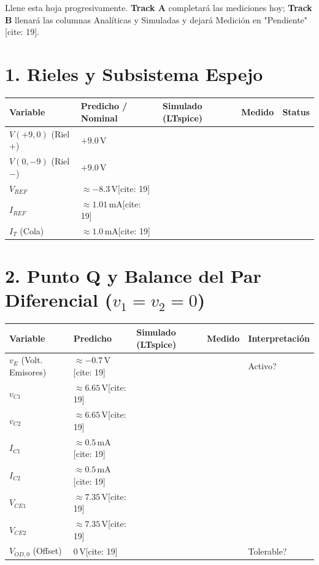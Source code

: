 \documentclass[11pt, a4paper]{article}
\begin{document}
\begin{tcolorbox}[colback=ucbblue!5, colframe=ucbblue, title=\textbf{Registro de Evidencia: Hito 2 (Sesión 1)}]
    Llene esta hoja progresivamente. \textbf{Track A} completará las mediciones hoy; \textbf{Track B} llenará las columnas Analíticas y Simuladas y dejará Medición en "Pendiente"[cite: 19].
\end{tcolorbox}

\section*{1. Rieles y Subsistema Espejo}
\renewcommand{\arraystretch}{1.5}
\begin{tabularx}{\textwidth}{|>{\raggedright\arraybackslash}p{3cm}|>{\centering\arraybackslash}X|>{\centering\arraybackslash}X|>{\centering\arraybackslash}X|>{\centering\arraybackslash}p{2.5cm}|}
\hline
\rowcolor{ucbblue!20}
\textbf{Variable} & \textbf{Predicho / Nominal} & \textbf{Simulado (LTspice)} & \textbf{Medido} & \textbf{Status} \\ \hline
$V(+9,0)$ (Riel $+$) & $+9.0\,\text{V}$ & & & \\ \hline
$V(0,-9)$ (Riel $-$) & $+9.0\,\text{V}$ & & & \\ \hline
$V_{REF}$ & $\approx -8.3\,\text{V}$[cite: 19] & & & \\ \hline
$I_{REF}$ & $\approx 1.01\,\text{mA}$[cite: 19] & & & \\ \hline
$I_T$ (Cola) & $\approx 1.0\,\text{mA}$[cite: 19] & & & \\ \hline
\end{tabularx}

\section*{2. Punto Q y Balance del Par Diferencial ($v_1=v_2=0$)}
\begin{tabularx}{\textwidth}{|>{\raggedright\arraybackslash}p{3cm}|>{\centering\arraybackslash}X|>{\centering\arraybackslash}X|>{\centering\arraybackslash}X|>{\centering\arraybackslash}p{2.5cm}|}
\hline
\rowcolor{ucbblue!20}
\textbf{Variable} & \textbf{Predicho} & \textbf{Simulado (LTspice)} & \textbf{Medido} & \textbf{Interpretación} \\ \hline
$v_E$ (Volt. Emisores) & $\approx -0.7\,\text{V}$[cite: 19] & & & Activo? \\ \hline
$v_{C1}$ & $\approx 6.65\,\text{V}$[cite: 19] & & & \\ \hline
$v_{C2}$ & $\approx 6.65\,\text{V}$[cite: 19] & & & \\ \hline
$I_{C1}$ & $\approx 0.5\,\text{mA}$[cite: 19] & & & \\ \hline
$I_{C2}$ & $\approx 0.5\,\text{mA}$[cite: 19] & & & \\ \hline
$V_{CE1}$ & $\approx 7.35\,\text{V}$[cite: 19] & & & \\ \hline
$V_{CE2}$ & $\approx 7.35\,\text{V}$[cite: 19] & & & \\ \hline
$V_{OD,0}$ (Offset) & $0\,\text{V}$[cite: 19] & & & Tolerable? \\ \hline
\end{tabularx}
\end{document}
